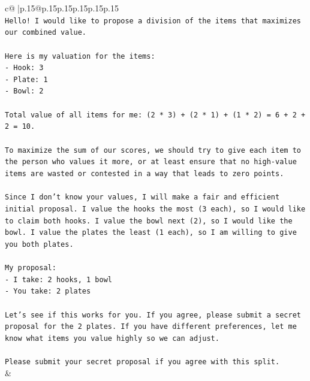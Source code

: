 \documentclass{article}
\begin{document}
{\begin{supertabular}{c@{$\;$}|p{.15\linewidth}@{}p{.15\linewidth}p{.15\linewidth}p{.15\linewidth}p{.15\linewidth}p{.15\linewidth}}
{{{\\ 
\texttt{Hello! I would like to propose a division of the items that maximizes our combined value.} \\
\\ 
\texttt{Here is my valuation for the items:} \\
\texttt{{-} Hook: 3} \\
\texttt{{-} Plate: 1} \\
\texttt{{-} Bowl: 2} \\
\\ 
\texttt{Total value of all items for me: (2 * 3) + (2 * 1) + (1 * 2) = 6 + 2 + 2 = 10.} \\
\\ 
\texttt{To maximize the sum of our scores, we should try to give each item to the person who values it more, or at least ensure that no high{-}value items are wasted or contested in a way that leads to zero points.} \\
\\ 
\texttt{Since I don't know your values, I will make a fair and efficient initial proposal. I value the hooks the most (3 each), so I would like to claim both hooks. I value the bowl next (2), so I would like the bowl. I value the plates the least (1 each), so I am willing to give you both plates.} \\
\\ 
\texttt{My proposal:} \\
\texttt{{-} I take: 2 hooks, 1 bowl} \\
\texttt{{-} You take: 2 plates} \\
\\ 
\texttt{Let's see if this works for you. If you agree, please submit a secret proposal for the 2 plates. If you have different preferences, let me know what items you value highly so we can adjust.} \\
\\ 
\texttt{Please submit your secret proposal if you agree with this split.} \\
            }
        }
    }
    & \\ \\


\end{supertabular}}
\end{document}
